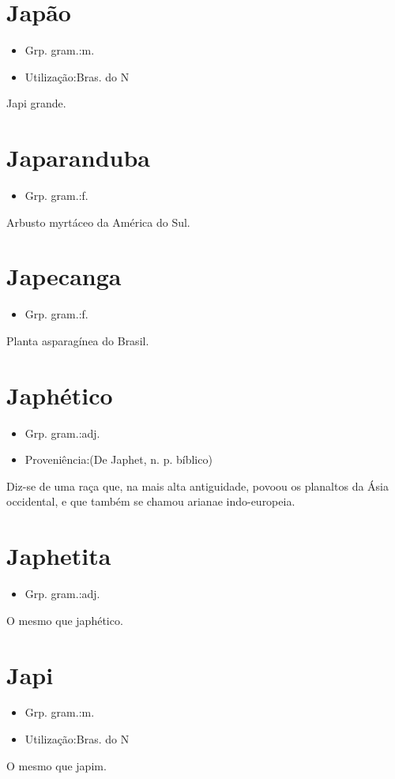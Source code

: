 \documentclass{article}
\begin{document}
\section{Japão}
\begin{itemize}
\item {Grp. gram.:m.}
\end{itemize}
\begin{itemize}
\item {Utilização:Bras. do N}
\end{itemize}
Japi grande.
\section{Japaranduba}
\begin{itemize}
\item {Grp. gram.:f.}
\end{itemize}
Arbusto myrtáceo da América do Sul.
\section{Japecanga}
\begin{itemize}
\item {Grp. gram.:f.}
\end{itemize}
Planta asparagínea do Brasil.
\section{Japhético}
\begin{itemize}
\item {Grp. gram.:adj.}
\end{itemize}
\begin{itemize}
\item {Proveniência:(De \textunderscore Japhet\textunderscore , n. p. bíblico)}
\end{itemize}
Diz-se de uma raça que, na mais alta antiguidade, povoou os planaltos da Ásia occidental, e que também se chamou \textunderscore ariana\textunderscore  e \textunderscore indo-europeia\textunderscore .
\section{Japhetita}
\begin{itemize}
\item {Grp. gram.:adj.}
\end{itemize}
O mesmo que \textunderscore japhético\textunderscore .
\section{Japi}
\begin{itemize}
\item {Grp. gram.:m.}
\end{itemize}
\begin{itemize}
\item {Utilização:Bras. do N}
\end{itemize}
O mesmo que \textunderscore japim\textunderscore .
\end{document}
